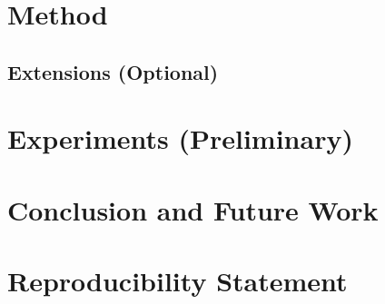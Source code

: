 \documentclass{article}
\begin{document}
\section{Method}

\subsection{Extensions (Optional)}


\section{Experiments (Preliminary)}


\section{Conclusion and Future Work}



\section*{Reproducibility Statement}
\end{document}
